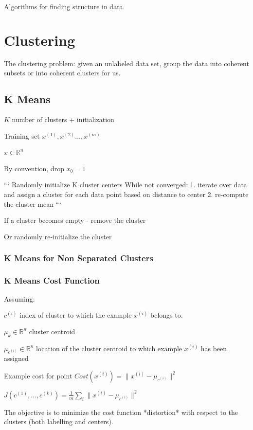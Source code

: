 {{Algorithms for finding structure in data.

\section{Clustering}

The clustering problem: given an unlabeled data set, group the data into coherent  subsets or into coherent clusters for us.

\subsection{K Means}

\item $K$ number of clusters + initialization
\item Training set ${x^{(1)},x^{(2)}\dots,x^{(m)}}$
\item $x\in\mathbb{R}^n$
\item By convention, drop $x_0=1$

```
Randomly initialize K cluster centers
While not converged:
1. iterate over data and assign a cluster for each data point based on distance to center
2. re-compute the cluster mean
```

If a cluster becomes empty - remove the cluster

Or randomly re-initialize the cluster

\subsubsection{K Means for Non Separated Clusters}

\subsubsection{K Means Cost Function}

Assuming: 

$c^{(i)}$ index of cluster to which the example $x^{(i)}$ belongs to.

$\mu_k \in \mathbb R ^n $ cluster centroid 

$\mu_{c^{(i)}} \in \mathbb R ^n $ location of the cluster centroid to which example $x^{(i)}$ has been assigned

Example cost for point $Cost(x^{(i)}) = \|x^{(i)} - \mu_{c^{(i)}} \|^2$ 

$J(c^{(1)},\dots, c^{(k)})= \frac{1}{m}\sum_i \|x^{(i)} - \mu_{c^{(i)}} \|^2 $

The objective is to minimize the cost function *distortion* with respect to the clusters (both labelling and centers).

}}
